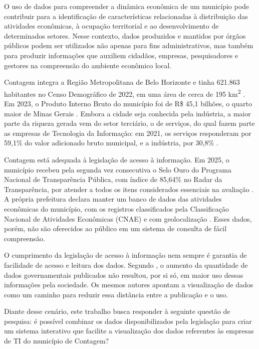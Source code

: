 \documentclass[a4paper,12pt]{article}
\begin{document}
O uso de dados para compreender a dinâmica econômica de um município pode contribuir para a identificação de características relacionadas à distribuição das atividades econômicas, à ocupação territorial e ao desenvolvimento de determinados setores.
Nesse contexto, dados produzidos e mantidos por órgãos públicos podem ser utilizados não apenas para fins administrativos, mas também para produzir informações que auxiliem cidadãos, empresas, pesquisadores e gestores na compreensão do ambiente econômico local.

Contagem integra a Região Metropolitana de Belo Horizonte e tinha 621.863 habitantes no Censo Demográfico de 2022, em uma área de cerca de 195 km\textsuperscript{2} \cite{ibge2026}.
Em 2023, o Produto Interno Bruto do município foi de R\$ 45,1 bilhões, o quarto maior de Minas Gerais \cite{ibge2026}.
Embora a cidade seja conhecida pela indústria, a maior parte da riqueza gerada vem do setor terciário, o de serviços, do qual fazem parte as empresas de Tecnologia da Informação: em 2021, os serviços responderam por 59,1\% do valor adicionado bruto municipal, e a indústria, por 30,8\% \cite{ibge2026}.

Contagem está adequada à legislação de acesso à informação.
Em 2025, o município recebeu pela segunda vez consecutiva o Selo Ouro do Programa Nacional de Transparência Pública, com índice de 85,64\% no Radar da Transparência, por atender a todos os itens considerados essenciais na avaliação \cite{contagem2025}.
A própria prefeitura declara manter um banco de dados das atividades econômicas do município, com os registros classificados pela Classificação Nacional de Atividades Econômicas (CNAE) e com geolocalização \cite{contagem2026}.
Esses dados, porém, não são oferecidos ao público em um sistema de consulta de fácil compreensão.

O cumprimento da legislação de acesso à informação nem sempre é garantia de facilidade de acesso e leitura dos dados.
Segundo , o aumento da quantidade de dados governamentais publicados não resultou, por si só, em maior uso dessas informações pela sociedade.
Os mesmos autores apontam a visualização de dados como um caminho para reduzir essa distância entre a publicação e o uso.

Diante desse cenário, este trabalho busca responder à seguinte questão de pesquisa: é possível combinar os dados disponibilizados pela legislação para criar um sistema interativo que facilite a visualização dos dados referentes às empresas de TI do município de Contagem?
\end{document}
